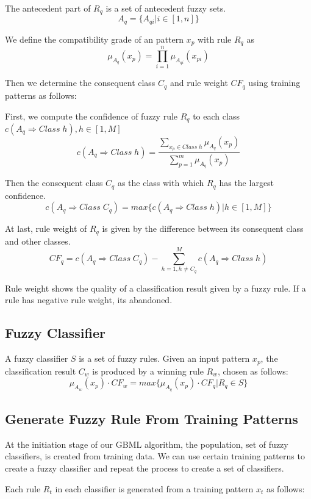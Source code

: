 \documentclass[conference]{IEEEtran}
\begin{document}
  The antecedent part of $R_q$ is a set of antecedent fuzzy sets. $$A_q = \{A_{qi}|i\in [1,n]\}$$

  We define the compatibility grade of an pattern $x_p$ with rule $R_q$ as
  $$\mu_{A_q}(x_p) = \prod_{i = 1}^{n}\mu_{A_{qi}}(x_{pi})$$

  Then we determine the consequent class $C_q$ and rule weight $CF_q$ using training patterns as follows:

  First, we compute the confidence of fuzzy rule $R_q$ to each class $c(A_q \Rightarrow Class\;h), h \in[1,M]$
  $$c(A_q \Rightarrow Class\; h) = \frac{\sum\limits_{x_p \in Class\;h}\mu_{A_q}(x_p)}{\sum\limits_{p=1}^m\mu_{A_q}(x_p)}$$

  Then the consequent class $C_q$ as the class with which $R_q$ has the largest confidence.
  $$c(A_q \Rightarrow Class\;C_q)=max\{c(A_q \Rightarrow Class\;h)|h \in [1,M]\}$$
  
  At last, rule weight of $R_q$ is given by the difference between its consequent class and other classes.
  $$CF_q = c(A_q\Rightarrow Class\;C_q)-\sum\limits_{h=1, h\neq C_q}^{M}c(A_q\Rightarrow Class \; h)$$

  Rule weight shows the quality of a classification result given by a fuzzy rule. If a rule has negative rule weight, its abandoned.
  
  \subsection{Fuzzy Classifier}
  
  A fuzzy classifier $S$ is a set of fuzzy rules. Given an input pattern $x_p$, the classification result $C_w$ is produced by a winning rule $R_w$, chosen as follows:
  $$\mu_{A_w}(x_p) \cdot CF_w = max\{\mu_{A_q}(x_p)\cdot CF_q|R_q\in S\}$$
  \subsection{Generate Fuzzy Rule From Training Patterns}
  At the initiation stage of our GBML algorithm, the population, set of fuzzy classifiers, is created from training data. We can use certain training patterns to create a fuzzy classifier and repeat the process to create a set of classifiers.
  
  Each rule $R_t$ in each classifier is generated from a training pattern $x_t$ as follows:
\end{document}
